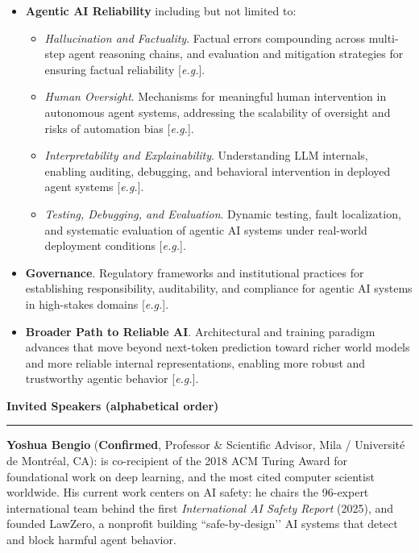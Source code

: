 \documentclass{article}
\newcommand{\confirmed}{\textcolor{green!60!black}{\textbf{Confirmed}}}
\newcommand{\eg}{\textit{e.g.}}
\newcommand{\sectiontitle}[1]{\noindent\textbf{\textcolor{neuripsblue}{#1}}\vspace{0.1cm}\hrule\vspace{0.2cm}}
\begin{document}
\begin{itemize}[leftmargin=10pt,itemsep=1pt,topsep=2pt]
\begin{itemize}[itemsep=1pt,topsep=0pt]
\item \textit{Privacy and Data Leakage}. Training data extraction, membership inference, and sensitive data leakage, and mitigation against them [\eg \cite{lukas2023analyzing, carlini2023memorization}].
\end{itemize}

\item \textbf{Agentic AI Reliability} including but not limited to:
\begin{itemize}[itemsep=1pt,topsep=0pt]

\item \textit{Hallucination and Factuality}. Factual errors compounding across multi-step agent reasoning chains, and evaluation and mitigation strategies for ensuring factual reliability [\eg \cite{lin2022truthfulqa, tian2023finetuning}].

\item \textit{Human Oversight}. Mechanisms for meaningful human intervention in autonomous agent systems, addressing the scalability of oversight and risks of automation bias [\eg \cite{burns2024weak, kenton2024scalable}].

\item \textit{Interpretability and Explainability}. Understanding LLM internals, enabling auditing, debugging, and behavioral intervention in deployed agent systems [\eg \cite{conmy2023automated, tigges2024llm}].

\item \textit{Testing, Debugging, and Evaluation}. Dynamic testing, fault localization, and systematic evaluation of agentic AI systems under real-world deployment conditions [\eg \cite{jimenez2024swebench, xia2025agentless, xia2023automated}].
\end{itemize}
\item \textbf{Governance}. Regulatory frameworks and institutional practices for establishing responsibility, auditability, and compliance for agentic AI systems in high-stakes domains [\eg \cite{mitchell2019model, bender2021stochastic}].
\item \textbf{Broader Path to Reliable AI}. Architectural and training paradigm advances that move beyond next-token prediction toward richer world models and more reliable internal representations, enabling more robust and trustworthy agentic behavior [\eg \cite{huang2026llmjepa}].
\end{itemize}


\sectiontitle{Invited Speakers (alphabetical order)}
\vspace{-2pt}
 \textbf{Yoshua Bengio} (\confirmed, Professor \& Scientific Advisor, Mila / Université de Montréal, CA): is co-recipient of the 2018 ACM Turing Award for foundational work on deep learning, and the most cited computer scientist worldwide. His current work centers on AI safety: he chairs the 96-expert international team behind the first \textit{International AI Safety Report} (2025), and founded LawZero, a nonprofit building ``safe-by-design’’ AI systems that detect and block harmful agent behavior.
\end{document}
